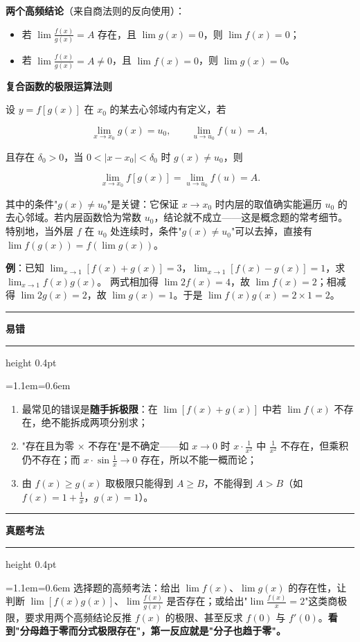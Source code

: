 \documentclass[11pt,openany,UTF8]{ctexbook}
\newcommand{\callouthead}[2]{%
  \par\addvspace{7pt}\noindent
  {\color{#1}\rule[-0.15em]{3pt}{1.05em}}\hspace{0.5em}%
  {\bfseries\color{#1}#2}\par\nobreak\vspace{-0.35em}%
  {\color{rulesep}\hrule height 0.4pt}\nobreak\vspace{0.45em}%
  \begingroup\small\setlength{\parindent}{0pt}%
  \leftskip=1.1em\rightskip=0.6em\noindent\ignorespaces}
\newcommand{\calloutend}{\par\endgroup\addvspace{7pt}}
\newenvironment{callwarn}[1]{\callouthead{warnbar}{#1}}{\calloutend}
\newenvironment{callexam}[1]{\callouthead{exambar}{#1}}{\calloutend}
\begin{document}
\textbf{两个高频结论}（来自商法则的反向使用）：

\begin{itemize}
\item 若 $\lim\frac{f(x)}{g(x)}=A$ 存在，且 $\lim g(x)=0$，则 $\lim f(x)=0$；
\item 若 $\lim\frac{f(x)}{g(x)}=A\ne 0$，且 $\lim f(x)=0$，则 $\lim g(x)=0$。
\end{itemize}
\textbf{复合函数的极限运算法则}

设 $y=f[g(x)]$ 在 $x_0$ 的某去心邻域内有定义，若

\[\lim_{x\to x_0}g(x)=u_0,\qquad \lim_{u\to u_0}f(u)=A,\]

且存在 $\delta_0>0$，当 $0<\vert x-x_0\vert<\delta_0$ 时 $g(x)\ne u_0$，则

\[\lim_{x\to x_0}f[g(x)]=\lim_{u\to u_0}f(u)=A .\]

其中的条件"$g(x)\ne u_0$"是关键：它保证 $x\to x_0$ 时内层的取值确实能遍历 $u_0$ 的去心邻域。若内层函数恰为常数 $u_0$，结论就不成立——这是概念题的常考细节。特别地，当外层 $f$ 在 $u_0$ 处连续时，条件"$g(x)\ne u_0$"可以去掉，直接有 $\lim f(g(x))=f(\lim g(x))$。

\textbf{例}：已知 $\lim_{x\to 1}[f(x)+g(x)]=3$，$\lim_{x\to 1}[f(x)-g(x)]=1$，求 $\lim_{x\to 1}f(x)g(x)$。 两式相加得 $\lim 2f(x)=4$，故 $\lim f(x)=2$；相减得 $\lim 2g(x)=2$，故 $\lim g(x)=1$。于是 $\lim f(x)g(x)=2\times 1=2$。

\begin{callwarn}{易错}
\begin{enumerate}
\item 最常见的错误是\textbf{随手拆极限}：在 $\lim[f(x)+g(x)]$ 中若 $\lim f(x)$ 不存在，绝不能拆成两项分别求；
\item "存在且为零 $\times$ 不存在"是不确定——如 $x\to 0$ 时 $x\cdot\frac{1}{x^2}$ 中 $\frac{1}{x^2}$ 不存在，但乘积仍不存在；而 $x\cdot\sin\frac1x\to 0$ 存在，所以不能一概而论；
\item 由 $f(x)\ge g(x)$ 取极限只能得到 $A\ge B$，不能得到 $A>B$（如 $f(x)=1+\frac1x$，$g(x)=1$）。
\end{enumerate}
\end{callwarn}

\begin{callexam}{真题考法}
选择题的高频考法：给出 $\lim f(x)$、$\lim g(x)$ 的存在性，让判断 $\lim[f(x)g(x)]$、$\lim\frac{f(x)}{g(x)}$ 是否存在；或给出"$\lim\frac{f(x)}{x}=2$"这类商极限，要求用两个高频结论反推 $f(x)$ 的极限、甚至反求 $f(0)$ 与 $f'(0)$。\textbf{看到"分母趋于零而分式极限存在"，第一反应就是"分子也趋于零"。}

\end{callexam}
\end{document}
